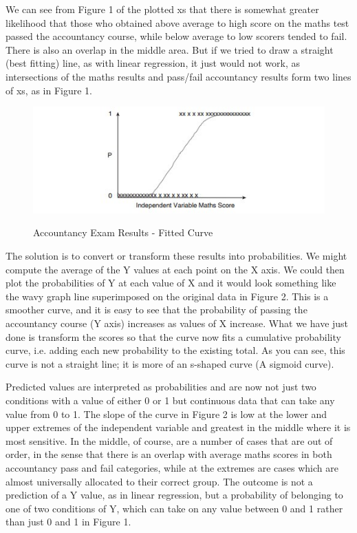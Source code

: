 \documentclass[a4paper,12pt]{article}
\begin{document}
We can see from Figure 1 of the plotted xs that there is somewhat greater likelihood
that those who obtained above average to high score on the maths test passed the accountancy course, while below average to low scorers tended to fail. There is also an overlap in
the middle area. But if we tried to draw a straight (best fitting) line, as with linear regression,
it just would not work, as intersections of the maths results and pass/fail accountancy results
form two lines of xs, as in Figure 1.
%
\begin{center}
\begin{figure}
  \includegraphics[scale=0.8]{images/Logistic2}\\
  \caption{Accountancy Exam Results - Fitted Curve}
\end{figure}
\end{center}

The solution is to convert or transform these results into probabilities. We might compute
the average of the Y values at each point on the X axis. We could then plot the probabilities
of Y at each value of X and it would look something like the wavy graph line superimposed
on the original data in Figure 2. This is a smoother curve, and it is easy to see that the
probability of passing the accountancy course (Y axis) increases as values of X increase.
What we have just done is transform the scores so that the curve now fits a cumulative
probability curve, i.e. adding each new probability to the existing total. As you can see, this
curve is not a straight line; it is more of an s-shaped curve (A sigmoid curve).

Predicted values are interpreted as probabilities and are now not just two conditions with a value of either 0 or 1 but continuous data that can take any value from 0 to 1.
The slope of the curve in Figure 2 is low at the lower and upper extremes of the
independent variable and greatest in the middle where it is most sensitive. In the middle, of
course, are a number of cases that are out of order, in the sense that there is an overlap with
average maths scores in both accountancy pass and fail categories, while at the extremes are
cases which are almost universally allocated to their correct group. The outcome is not a prediction of a Y value, as in linear regression, but a probability of belonging to one of two conditions
of Y, which can take on any value between 0 and 1 rather than just 0 and 1 in Figure 1.
\end{document}
